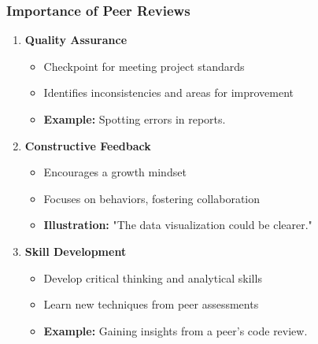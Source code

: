 \documentclass[aspectratio=169]{beamer}
\begin{document}
\begin{frame}[fragile]
    \frametitle{Importance of Peer Reviews}
    \begin{enumerate}
        \item \textbf{Quality Assurance}
        \begin{itemize}
            \item Checkpoint for meeting project standards
            \item Identifies inconsistencies and areas for improvement
            \item \textbf{Example:} Spotting errors in reports.
        \end{itemize}
        
        \item \textbf{Constructive Feedback}
        \begin{itemize}
            \item Encourages a growth mindset
            \item Focuses on behaviors, fostering collaboration
            \item \textbf{Illustration:} "The data visualization could be clearer."
        \end{itemize}

        \item \textbf{Skill Development}
        \begin{itemize}
            \item Develop critical thinking and analytical skills
            \item Learn new techniques from peer assessments
            \item \textbf{Example:} Gaining insights from a peer's code review.
        \end{itemize}
    \end{enumerate}
\end{frame}
\end{document}
